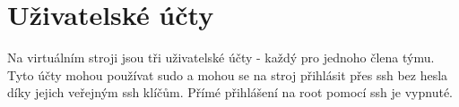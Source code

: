 \section{Uživatelské účty}
Na virtuálním stroji jsou tři uživatelské účty - každý pro jednoho člena týmu. Tyto účty mohou používat sudo a mohou se na stroj přihlásit přes ssh bez hesla díky jejich veřejným ssh klíčům.
Přímé přihlášení na root pomocí ssh je vypnuté.